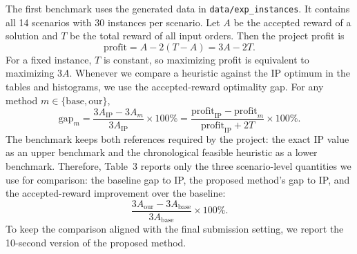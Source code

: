 \documentclass[10pt,a4paper]{article}
\begin{document}
The first benchmark uses the generated data in \texttt{data/exp\_instances}.
It contains all 14 scenarios with 30 instances per scenario.  Let $A$ be the
accepted reward of a solution and $T$ be the total reward of all input orders.
Then the project profit is
\[
\text{profit}=A-2(T-A)=3A-2T.
\]
For a fixed instance, $T$ is constant, so maximizing profit is equivalent to
maximizing $3A$.  Whenever we compare a heuristic against the IP optimum in the
tables and histograms, we use the accepted-reward optimality gap.  For any method
$m\in\{\mathrm{base},\mathrm{our}\}$,
\[
\text{gap}_m
=\frac{3A_{\mathrm{IP}}-3A_m}{3A_{\mathrm{IP}}}\times 100\%
=\frac{\text{profit}_{\mathrm{IP}}-\text{profit}_{m}}
{\text{profit}_{\mathrm{IP}}+2T}\times 100\%.
\]
The benchmark keeps both references required by the project: the exact IP value
as an upper benchmark and the chronological feasible heuristic as a lower
benchmark.  Therefore, Table~3 reports only the three scenario-level quantities
we use for comparison: the baseline gap to IP, the proposed method's gap to IP,
and the accepted-reward improvement over the baseline:
\[
\frac{3A_{\mathrm{our}}-3A_{\mathrm{base}}}{3A_{\mathrm{base}}}\times 100\%.
\]
To keep the comparison aligned with the final submission setting, we report the
10-second version of the proposed method.
\end{document}
